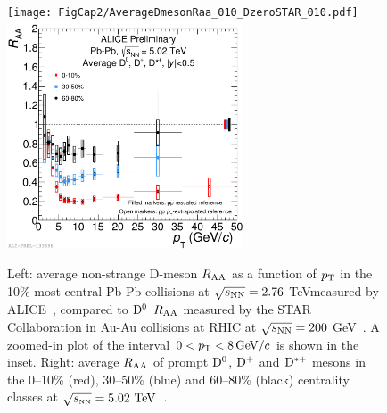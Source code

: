\begin{figure}[!ht]
  \centering
    \texttt{[image: FigCap2/AverageDmesonRaa\_010\_DzeroSTAR\_010.pdf]}
    \includegraphics[width=7cm]{FigCap2/2017-Jul-05-DmesonAverage_010_3050_6080_comparison_04July2017.pdf}
  \caption{Left: average non-strange D-meson $R_{\rm AA}$ as a function of $p_{\rm T}$ in the 10\% most central Pb-Pb collisions at
 $\sqrt{s_{\rm NN}}=2.76$ TeVmeasured by ALICE~\cite{Adam:2015sza}, compared to ${\rm D^0}$ $R_{\rm AA}$ measured by the STAR Collaboration in Au-Au collisions at RHIC at
$\sqrt{s_{\rm NN}}=200$ GeV~\cite{Adamczyk:2014uip}. A zoomed-in plot of the interval $0 < p_{\rm T} < 8\, \mathrm{GeV}/c$ is shown in the inset. Right: average $R_{\rm AA}$ 
  of prompt ${\rm D^0}$, ${\rm D^+}$ and ${\rm D^{*+}}$ mesons in the 0--10\% (red), 30--50\% (blue) and 60--80\% (black) centrality classes at $\sqrt{s_{\rm \scriptscriptstyle NN}}=5.02~\mathrm{TeV}$~\cite{ALICE-PUBLIC-2017-003}.  }
  \label{fig:Raa}
\end{figure}

